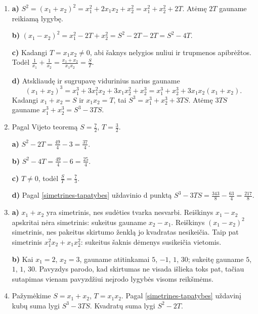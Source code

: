 \documentclass[12pt,a4paper]{article}
\begin{document}
\begin{enumerate}
\textbf{b)} Pagal šaknų sumos formulę $x_1+x_2=-\frac{b}{a}$. Kadangi viena šaknis lygi $0$, kita yra $x_2=-\frac{b}{a}$. Sandaugos formulė duoda $0\cdot x_2=0$, o šią lygybę tenkina bet kuris $x_2$, todėl vien iš jos kitos šaknies nustatyti negalima. Dalydami iš nulio gautume neapibrėžtą reiškinį $\frac{0}{0}$.

\textbf{c)} Kai $b=0$, lygtis $ax^2=0$ turi vieną šaknį $0$. Vijeto formulėse žymime $x_1=x_2=0$, todėl nėra kitos nuo jos skirtingos šaknies.
\item \textbf{a)} $S^2=(x_1+x_2)^2=x_1^2+2x_1x_2+x_2^2=x_1^2+x_2^2+2T$. Atėmę $2T$ gauname reikiamą lygybę.

\textbf{b)} $(x_1-x_2)^2=x_1^2-2T+x_2^2=S^2-2T-2T=S^2-4T$.

\textbf{c)} Kadangi $T=x_1x_2\ne0$, abi šaknys nelygios nuliui ir trupmenos apibrėžtos. Todėl $\frac{1}{x_1}+\frac{1}{x_2}=\frac{x_1+x_2}{x_1x_2}=\frac{S}{T}$.

\textbf{d)} Atskliaudę ir sugrupavę vidurinius narius gauname
\[(x_1+x_2)^3=x_1^3+3x_1^2x_2+3x_1x_2^2+x_2^3=x_1^3+x_2^3+3x_1x_2(x_1+x_2).\]
Kadangi $x_1+x_2=S$ ir $x_1x_2=T$, tai $S^3=x_1^3+x_2^3+3TS$. Atėmę $3TS$ gauname $x_1^3+x_2^3=S^3-3TS$.
\item Pagal Vijeto teoremą $S=\frac{7}{2}$, $T=\frac{3}{2}$.

\textbf{a)} $S^2-2T=\frac{49}{4}-3=\frac{37}{4}$.

\textbf{b)} $S^2-4T=\frac{49}{4}-6=\frac{25}{4}$.

\textbf{c)} $T\ne0$, todėl $\frac{S}{T}=\frac{7}{3}$.

\textbf{d)} Pagal \ref{simetrines-tapatybes} uždavinio d punktą $S^3-3TS=\frac{343}{8}-\frac{63}{4}=\frac{217}{8}$.
\item \textbf{a)} $x_1+x_2$ yra simetrinis, nes sudėties tvarka nesvarbi. Reiškinys $x_1-x_2$ apskritai nėra simetrinis: sukeitus gauname $x_2-x_1$. Reiškinys $(x_1-x_2)^2$ simetrinis, nes pakeitus skirtumo ženklą jo kvadratas nesikeičia. Taip pat simetrinis $x_1^2x_2+x_1x_2^2$: sukeitus šaknis dėmenys susikeičia vietomis.

\textbf{b)} Kai $x_1=2$, $x_2=3$, gauname atitinkamai $5$, $-1$, $1$, $30$; sukeitę gauname $5$, $1$, $1$, $30$. Pavyzdys parodo, kad skirtumas ne visada išlieka toks pat, tačiau sutapimas vienam pavyzdžiui neįrodo lygybės visoms reikšmėms.
\item Pažymėkime $S=x_1+x_2$, $T=x_1x_2$. Pagal \ref{simetrines-tapatybes} uždavinį kubų suma lygi $S^3-3TS$. Kvadratų suma lygi $S^2-2T$.


\end{enumerate}
\end{document}
